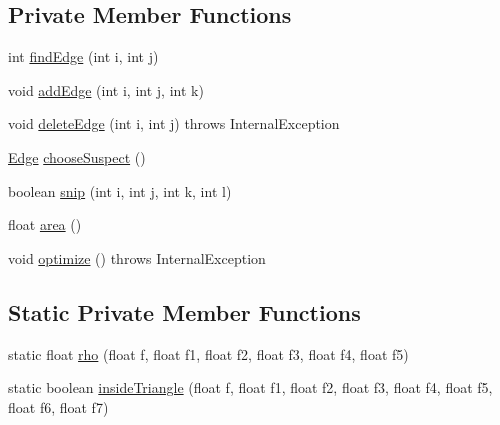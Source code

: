 \subsection*{Private Member Functions}
\begin{DoxyCompactItemize}
\item 
int \mbox{\hyperlink{classorg_1_1newdawn_1_1slick_1_1geom_1_1_neat_triangulator_a78cbec0ff58e88805e3174b00ac42dc4}{find\+Edge}} (int i, int j)
\item 
void \mbox{\hyperlink{classorg_1_1newdawn_1_1slick_1_1geom_1_1_neat_triangulator_a71083562024c4442249a515d92e70c00}{add\+Edge}} (int i, int j, int k)
\item 
void \mbox{\hyperlink{classorg_1_1newdawn_1_1slick_1_1geom_1_1_neat_triangulator_a673c87f2077e95be1fc7dcfd61c02831}{delete\+Edge}} (int i, int j)  throws Internal\+Exception     
\item 
\mbox{\hyperlink{classorg_1_1newdawn_1_1slick_1_1geom_1_1_neat_triangulator_1_1_edge}{Edge}} \mbox{\hyperlink{classorg_1_1newdawn_1_1slick_1_1geom_1_1_neat_triangulator_a0d36e6ed2cd14c353f7d3192cb403ed9}{choose\+Suspect}} ()
\item 
boolean \mbox{\hyperlink{classorg_1_1newdawn_1_1slick_1_1geom_1_1_neat_triangulator_ae7609b9e246ca3e4c4716d89c4a8a66f}{snip}} (int i, int j, int k, int l)
\item 
float \mbox{\hyperlink{classorg_1_1newdawn_1_1slick_1_1geom_1_1_neat_triangulator_ab9876be3379b56e71cce96d15fdd9044}{area}} ()
\item 
void \mbox{\hyperlink{classorg_1_1newdawn_1_1slick_1_1geom_1_1_neat_triangulator_a9d31e5717d81b79f9be1c882031c549c}{optimize}} ()  throws Internal\+Exception     
\end{DoxyCompactItemize}
\subsection*{Static Private Member Functions}
\begin{DoxyCompactItemize}
\item 
static float \mbox{\hyperlink{classorg_1_1newdawn_1_1slick_1_1geom_1_1_neat_triangulator_a8d1807a32fd407da54f5fc48302197f3}{rho}} (float f, float f1, float f2, float f3, float f4, float f5)
\item 
static boolean \mbox{\hyperlink{classorg_1_1newdawn_1_1slick_1_1geom_1_1_neat_triangulator_a95e47c0ce903fd1ea4ed9d7143c10ca8}{inside\+Triangle}} (float f, float f1, float f2, float f3, float f4, float f5, float f6, float f7)
\end{DoxyCompactItemize}
